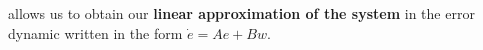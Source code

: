\documentclass{article}
\begin{document}
allows us to obtain our \textbf{linear approximation of the system}  in the error dynamic written in the form $ \dot{e}=Ae+Bw$.
\end{document}

